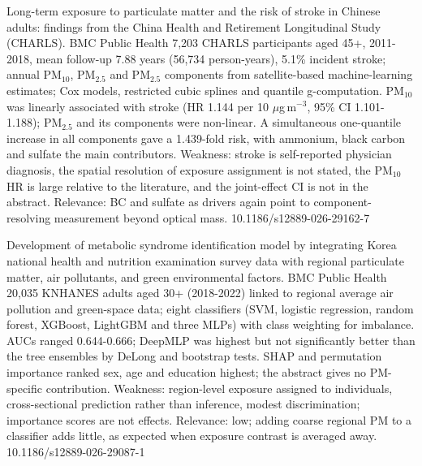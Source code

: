 \documentclass[10pt]{article}
\begin{document}
{Long-term exposure to particulate matter and the risk of stroke in Chinese adults: findings from the China Health and Retirement Longitudinal Study (CHARLS).}
{BMC Public Health}
{7,203 CHARLS participants aged 45+, 2011-2018, mean follow-up 7.88 years (56,734 person-years), 5.1\% incident stroke; annual PM$_{10}$, PM$_{2.5}$ and PM$_{2.5}$ components from satellite-based machine-learning estimates; Cox models, restricted cubic splines and quantile g-computation. PM$_{10}$ was linearly associated with stroke (HR 1.144 per 10 $\mu$g\,m$^{-3}$, 95\% CI 1.101-1.188); PM$_{2.5}$ and its components were non-linear. A simultaneous one-quantile increase in all components gave a 1.439-fold risk, with ammonium, black carbon and sulfate the main contributors. Weakness: stroke is self-reported physician diagnosis, the spatial resolution of exposure assignment is not stated, the PM$_{10}$ HR is large relative to the literature, and the joint-effect CI is not in the abstract. Relevance: BC and sulfate as drivers again point to component-resolving measurement beyond optical mass.}
{10.1186/s12889-026-29162-7}

{Development of metabolic syndrome identification model by integrating Korea national health and nutrition examination survey data with regional particulate matter, air pollutants, and green environmental factors.}
{BMC Public Health}
{20,035 KNHANES adults aged 30+ (2018-2022) linked to regional average air pollution and green-space data; eight classifiers (SVM, logistic regression, random forest, XGBoost, LightGBM and three MLPs) with class weighting for imbalance. AUCs ranged 0.644-0.666; DeepMLP was highest but not significantly better than the tree ensembles by DeLong and bootstrap tests. SHAP and permutation importance ranked sex, age and education highest; the abstract gives no PM-specific contribution. Weakness: region-level exposure assigned to individuals, cross-sectional prediction rather than inference, modest discrimination; importance scores are not effects. Relevance: low; adding coarse regional PM to a classifier adds little, as expected when exposure contrast is averaged away.}
{10.1186/s12889-026-29087-1}
\end{document}
